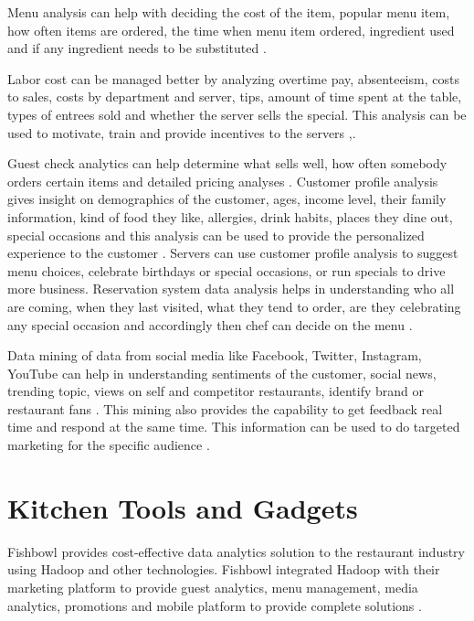 \documentclass[sigconf]{acmart}
\begin{document}
Menu analysis can help with deciding the cost of the item, popular menu item, how often items are ordered, the time when menu item ordered, ingredient used and if any ingredient needs to be substituted \cite{KooserAmandaC.2013BD}.

Labor cost can be managed better by analyzing overtime pay, absenteeism, costs to sales, costs by department and server, tips, amount of time spent at the table, types of entrees sold and whether the server sells the special. This analysis can be used to motivate, train and provide incentives to the servers \cite{www-restaurant},\cite{KooserAmandaC.2013BD}. 

Guest check analytics can help determine what sells well, how often somebody orders certain items and detailed pricing analyses \cite{www-restaurant}. 
Customer profile analysis gives insight on demographics of the customer, ages, income level, their family information, kind of food they like, allergies, drink habits, places they dine out, special occasions and this analysis can be used to provide the personalized experience to the customer \cite{www-restaurant}. Servers can use customer profile analysis to suggest menu choices, celebrate birthdays or special occasions, or run specials to drive more business. Reservation system data analysis helps in understanding who all are coming, when they last visited, what they tend to order, are they celebrating any special occasion and accordingly then chef can decide on the menu \cite{www-bostonglobe}. 

Data mining of data from social media like Facebook, Twitter, Instagram, YouTube can help in understanding sentiments of the customer, social news, trending topic, views on self and competitor restaurants, identify brand or restaurant fans \cite{JENNINGSLISA2015Mbds}. This mining also provides the capability to get feedback real time and respond at the same time. This information can be used to do targeted marketing for the specific audience \cite{JENNINGSLISA2015Mbds}. 

\section{Kitchen Tools and Gadgets}
Fishbowl provides cost-effective data analytics solution to the restaurant industry using Hadoop and other technologies. Fishbowl integrated Hadoop with their marketing platform to provide guest analytics, menu management, media analytics, promotions and mobile platform to provide complete solutions \cite{www-foodnewsfeed}\cite{www-fishbowl}.  
\end{document}
